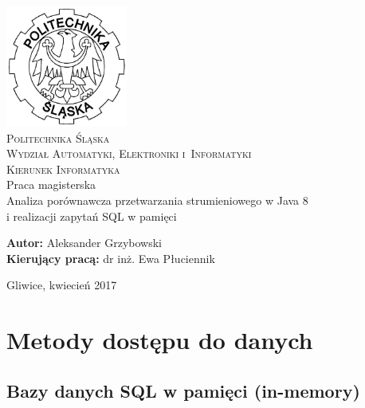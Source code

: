 \documentclass[12pt]{extarticle}
\begin{document}
\begin{titlepage}
    \begin{center}
        \includegraphics[width=4cm]{polsl.png}\\[1cm]
        \textsc{\LARGE{Politechnika Śląska}}\\[0.5cm]
        \textsc{\LARGE{Wydział Automatyki, Elektroniki i~Informatyki}}\\[0.5cm]
        \textsc{\LARGE{Kierunek Informatyka}}\\[2.5cm]
        \LARGE{Praca magisterska}\\[1cm]
        \begingroup
            \fontsize{14pt}{17pt}\selectfont
            Analiza porównawcza przetwarzania strumieniowego w Java 8 \\ i realizacji zapytań SQL w pamięci
        \endgroup
    \end{center}
    \vspace{2cm}
    \begingroup
        \fontsize{14pt}{17pt}\selectfont
        \textbf{Autor:} Aleksander Grzybowski\\
        \textbf{Kierujący pracą:} dr inż. Ewa Płuciennik\\
    \endgroup

    \vspace{1.0cm}
    \begingroup
        \fontsize{12pt}{14pt}\selectfont
        \begin{center}
        Gliwice, kwiecień 2017
        \end{center}
    \endgroup
\end{titlepage}

\clearpage

\tableofcontents

\newpage

\section{Metody dostępu do danych}

\subsection{Bazy danych SQL w pamięci (in-memory)}
\end{document}
